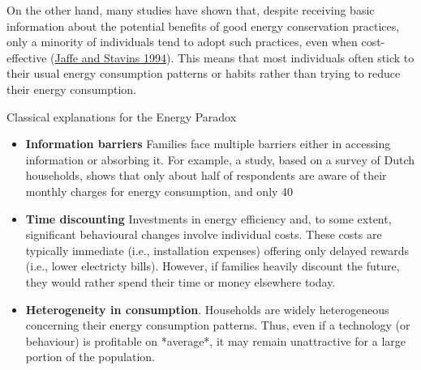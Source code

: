 \documentclass[
  12pt,
  captions=heading]{scrreport}
\begin{document}
On the other hand, many studies have shown that, despite receiving basic
information about the potential benefits of good energy conservation
practices, only a minority of individuals tend to adopt such practices,
even when cost-effective (\protect\hyperlink{ref-jaffe1994energy}{Jaffe
and Stavins 1994}). This means that most individuals often stick to
their usual energy consumption patterns or habits rather than trying to
reduce their energy consumption.

\begin{keypoints}
Classical explanations for the Energy Paradox
\begin{itemize}
<<<<<<< HEAD

\item \textbf{Information barriers} Families face multiple barriers either in accessing information or absorbing it. For example, a study, based on a survey of Dutch households, shows that only about half of respondents are aware of their monthly charges for energy consumption, and only 40%

\item \textbf{Time discounting} Investments in energy efficiency and, to some extent, significant behavioural changes involve individual costs. These costs are typically immediate (i.e., installation expenses) offering only delayed rewards (i.e., lower electricty bills). However, if families heavily discount the future, they would rather spend their time or money elsewhere today.

\item \textbf{Heterogeneity in consumption}. Households are widely heterogeneous concerning their energy consumption patterns. Thus, even if a technology (or behaviour) is profitable on *average*, it may remain unattractive for a large portion of the population.


\end{itemize}
\end{keypoints}
\end{document}
